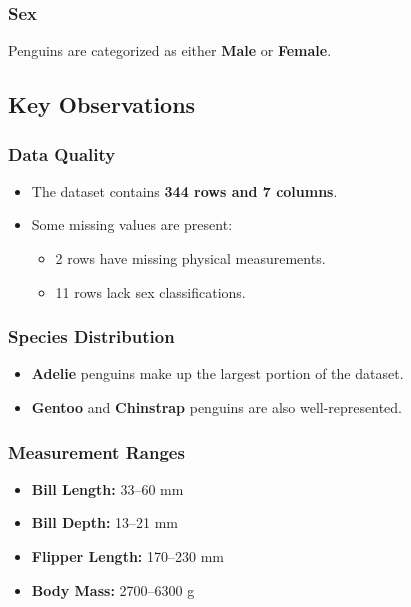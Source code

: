 \documentclass[12pt]{article}
\begin{document}
\begin{itemize}
\subsubsection*{Sex}
Penguins are categorized as either \textbf{Male} or \textbf{Female}.

\subsection*{Key Observations}

\subsubsection*{Data Quality}
\begin{itemize}
    \item The dataset contains \textbf{344 rows and 7 columns}.
    \item Some missing values are present:
        \begin{itemize}
            \item 2 rows have missing physical measurements.
            \item 11 rows lack sex classifications.
        \end{itemize}
\end{itemize}

\subsubsection*{Species Distribution}
\begin{itemize}
    \item \textbf{Adelie} penguins make up the largest portion of the dataset.
    \item \textbf{Gentoo} and \textbf{Chinstrap} penguins are also well-represented.
\end{itemize}

\subsubsection*{Measurement Ranges}
\begin{itemize}
    \item \textbf{Bill Length:} 33–60 mm
    \item \textbf{Bill Depth:} 13–21 mm
    \item \textbf{Flipper Length:} 170–230 mm
    \item \textbf{Body Mass:} 2700–6300 g
\end{itemize}


\end{itemize}
\end{document}
